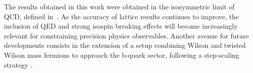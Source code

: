 The results obtained in this work were obtained in the isosymmetric limit of QCD, defined in~\citep{FlavourLatticeAveragingGroupFLAG:2021npn}. As the accuracy of lattice results continues to improve, the inclusion of QED and strong isospin breaking effects will become increasingly relevant for constraining precision physics observables. Another avenue for future developments consists in the extension of a setup combining Wilson and twisted Wilson mass fermions to approach  the b-quark sector, following a step-scaling strategy \cite{Sommer:2023gap}.


